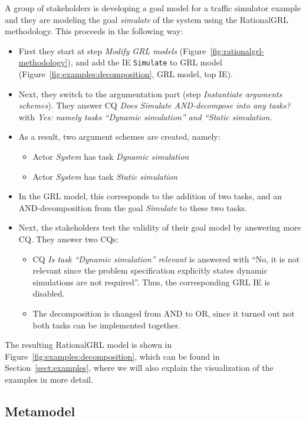 A group of stakeholders is developing a goal model for a traffic simulator example and they are modeling the goal \emph{simulate} of the system using the RationalGRL methodology. This proceeds in the following way:
\begin{itemize}
\item
First they start at step \emph{Modify GRL models} (Figure~\ref{fig:rationalgrl-methodology}), and add the IE \texttt{Simulate} to GRL model (Figure~\ref{fig:examples:decomposition}, GRL model, top IE).
\item Next, they switch to the argumentation part (step \emph{Instantiate arguments schemes}). They answer CQ \emph{Does Simulate AND-decompose into any tasks?} with \emph{Yes: namely tasks ``Dynamic simulation'' and ``Static simulation}.
\item As a result, two argument schemes are created, namely:
\begin{itemize}
\item Actor \emph{System} has task \emph{Dynamic simulation}
\item Actor \emph{System} has task \emph{Static simulation}
\end{itemize}
\item In the GRL model, this corresponds to the addition of two tasks, and an AND-decomposition from the goal \emph{Simulate} to these two tasks.
\item Next, the stakeholders test the validity of their goal model by answering more CQ. They answer two CQs:
\begin{itemize}
\item
CQ \emph{Is task ``Dynamic simulation'' relevant} is answered with ``No, it is not relevant since the problem specification explicitly states dynamic simulations are not required''. Thus, the corresponding GRL IE is disabled.
\item The decomposition is changed from AND to OR, since it turned out not both tasks can be implemented together.
\end{itemize}
\end{itemize}

The resulting RationalGRL model is shown in Figure~\ref{fig:examples:decomposition}, which can be found in Section~\ref{sect:examples}, where we will also explain the visualization of the examples in more detail.

\subsection{Metamodel}

